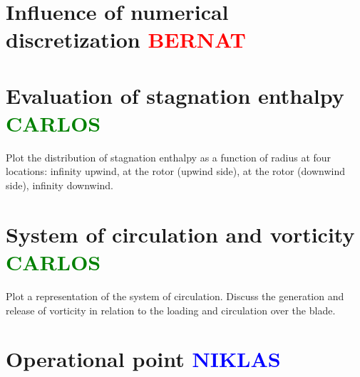 \section{Influence of numerical discretization \textcolor{red}{BERNAT}}

\section{Evaluation of stagnation enthalpy \textcolor{green}{CARLOS}}

Plot the distribution of stagnation enthalpy as a function of radius at four locations: infinity upwind, at the rotor (upwind side), at the rotor (downwind side), infinity downwind.

\section{System of circulation and vorticity \textcolor{green}{CARLOS}}

Plot a representation of the system of circulation. Discuss the generation and release of vorticity in relation to the loading and circulation over the blade.

\section{Operational point \textcolor{blue}{NIKLAS}}
